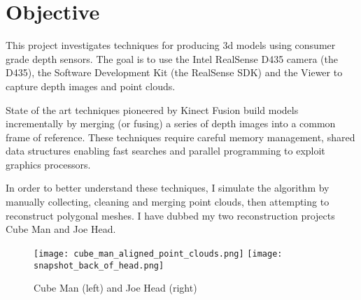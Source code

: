 \section{Objective}

This project investigates techniques for producing 3d models using consumer
grade depth sensors. The goal is to use the Intel RealSense D435 camera (the D435),
the Software Development Kit (the RealSense SDK) and the Viewer to capture
depth images and point clouds.

State of the art techniques pioneered by Kinect Fusion \cite{newcombe2011kinectfusion}
 build models incrementally by merging (or fusing) a series of depth images into
 a common frame of reference. These techniques require careful memory management,
 shared data structures enabling fast searches and parallel programming to exploit
 graphics processors.

In order to better understand these techniques, I simulate the algorithm by
manually collecting, cleaning and merging point clouds, then attempting
to reconstruct polygonal meshes. I have dubbed my two reconstruction projects
Cube Man and Joe Head.

\begin{figure}[h]
 \centering
 \texttt{[image: cube\_man\_aligned\_point\_clouds.png]}
 \texttt{[image: snapshot\_back\_of\_head.png]}
 \caption{Cube Man (left) and Joe Head (right)}
 \end{figure}
